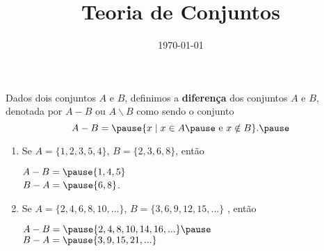 \documentclass{beamer}
\title{Teoria de Conjuntos}
\author[\autor]{\autor}
\institute[\instituto]{\instituto}
\date{\today}
\begin{document}
    \begin{frame}
        \maketitle
    \end{frame}


    \begin{frame}
        \begin{definicao}
            Dados dois conjuntos $A$ e $B$, \pause definimos a \textbf{diferen{\c c}a} \pause dos conjuntos $A$ e $B$, denotada por \pause $A - B$ ou $A \backslash B$ \pause como sendo o conjunto\pause
            \[
                A - B = \pause \{x \mid x \in A \pause \mbox{ e } x \notin B\}.\pause
            \]
        \end{definicao}

        \begin{exemplos}
            \begin{enumerate}[label={\arabic*})]
                \item Se $A=\{1,2,3,5,4\}$, \pause $B=\{2,3,6,8\}$, \pause ent\~ao
                \begin{center}
                    $A - B = \pause \{1,4,5\}$\pause\\
                    $B - A = \pause \{6,8\}$.\pause
                \end{center}
                \item Se $A=\{2,4,6,8,10,...\}$, \pause $B=\{3,6,9,12,15,...\}$ \pause, ent\~ao\pause
                \begin{center}
                    $A - B = \pause \{2,4,8,10,14,16,...\}\pause$\\
                    $B - A = \pause \{3,9,15,21,...\}$
                 \end{center}
            \end{enumerate}
        \end{exemplos}
    \end{frame}
\end{document}
